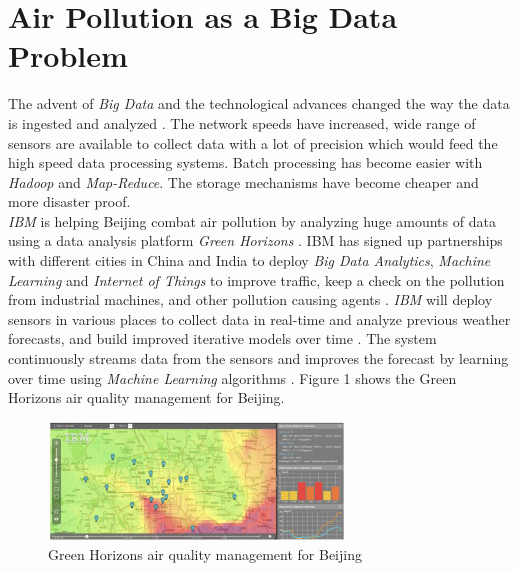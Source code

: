 \documentclass[sigconf]{acmart}
\begin{document}
\section{Air Pollution as a Big Data Problem}
The advent of {\em Big Data} and the technological advances changed the way the data is ingested and analyzed \cite{www-ibm1}. The network speeds have increased, wide range of sensors are available to collect data with a lot of precision which would feed the high speed data processing systems. Batch processing has become easier with {\em Hadoop} and {\em Map-Reduce}. The storage mechanisms have become cheaper and more disaster proof. \\
{\em IBM} is helping Beijing combat air pollution by analyzing huge amounts of data using a data analysis platform {\em Green Horizons} \cite{www-huff}. IBM has signed up partnerships with different cities in China and India to deploy {\em Big Data Analytics}, {\em Machine Learning} and {\em Internet of Things} to improve traffic, keep a check on the pollution from industrial machines, and other pollution causing agents \cite{www-huff}. {\em IBM} will deploy sensors in various places to collect data in real-time and analyze previous weather forecasts, and build improved iterative models over time \cite{www-huff}. The system continuously streams data from the sensors and improves the forecast by learning over time using {\em Machine Learning} algorithms \cite{www-huff}. Figure 1 shows the Green Horizons air quality management for Beijing.

\begin{figure}
\includegraphics[width=0.7\textwidth]{images/fig1.png}
\caption{Green Horizons air quality management for Beijing \cite{www-huff}}
\end{figure}
\end{document}
